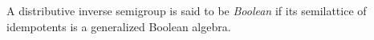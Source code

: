 \documentclass[a4paper]{amsart}
\newtheorem{lemma}[theorem]{Lemma}
\begin{document}



A distributive inverse semigroup is said to be {\em Boolean} if its semilattice of idempotents is a generalized Boolean algebra.
\end{document}
